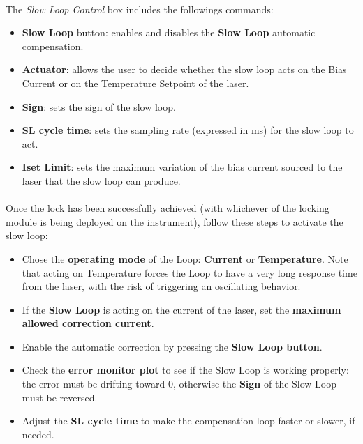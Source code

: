 \paragraph{} The \textit{Slow Loop Control} box includes the followings commands:
\begin{itemize}
    \item \textbf{Slow Loop} button: enables and disables the \textbf{Slow Loop} automatic compensation.
    
    \item \textbf{Actuator}: allows the user to decide whether the slow loop acts on the Bias Current or on the Temperature Setpoint of the laser.
    
    \item \textbf{Sign}: sets the sign of the slow loop.
    
    \item \textbf{SL cycle time}: sets the sampling rate (expressed in ms) for the slow loop to act.
    
    \item \textbf{Iset Limit}: sets the maximum variation of the bias current sourced to the laser that the slow loop can produce.
\end{itemize}

\paragraph{} Once the lock has been successfully achieved (with whichever of the locking module is being deployed on the instrument), follow these steps to activate the slow loop:
\begin{itemize}
    \item Chose the \textbf{operating mode} of the Loop: \textbf{Current} or \textbf{Temperature}. Note that acting on Temperature forces the Loop to have a very long response time from the laser, with the risk of triggering an oscillating behavior.
    
    \item If the \textbf{Slow Loop} is acting on the current of the laser, set the \textbf{maximum allowed correction current}.

    \item Enable the automatic correction by pressing the \textbf{Slow Loop button}.
    
    \item Check the \textbf{error monitor plot} to see if the Slow Loop is working properly: the error must be drifting toward 0, otherwise the \textbf{Sign} of the Slow Loop must be reversed.
    
    \item Adjust the \textbf{SL cycle time} to make the compensation loop faster or slower, if needed.
\end{itemize}